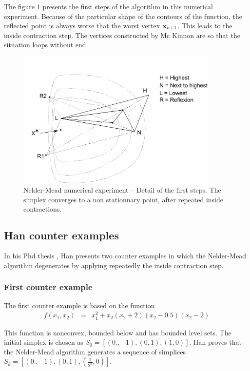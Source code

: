 The figure \ref{fig-nm-numexp-mckinnon-detail} presents the first steps 
of the algorithm in this numerical experiment. Because of the 
particular shape of the contours of the function, the reflected 
point is always worse that the worst vertex $\mathbf{x}_{n+1}$. This 
leads to the inside contraction step. The vertices constructed 
by Mc Kinnon are so that the situation loops without end.

\begin{figure}
\begin{center}
\includegraphics[width=10cm]{mcKinnon-insidecontraction.pdf}
\end{center}
\caption{Nelder-Mead numerical experiment -- Detail of the first steps.
The simplex converges to a non stationnary point, after repeated 
inside contractions.}
\label{fig-nm-numexp-mckinnon-detail}
\end{figure}

\subsection{Han counter examples}

In his Phd thesis \cite{Han2000}, Han presents two counter examples
in which the Nelder-Mead algorithm degenerates by applying repeatedly
the inside contraction step.

\subsubsection{First counter example}

The first counter example is based on the function 
\begin{eqnarray}
\label{han-function1}
f(x_1,x_2) &=& x_1^2 + x_2 ( x_2 + 2 ) ( x_2 - 0.5 ) ( x_2 - 2 )
\end{eqnarray}

This function is nonconvex, bounded below and has bounded level 
sets. The initial simplex is chosen as $S_0 = [(0.,-1),(0,1),(1,0)]$.
Han proves that the Nelder-Mead algorithm generates a sequence of simplices
$S_k = [(0.,-1),(0,1),(\frac{1}{2^k},0)]$.

